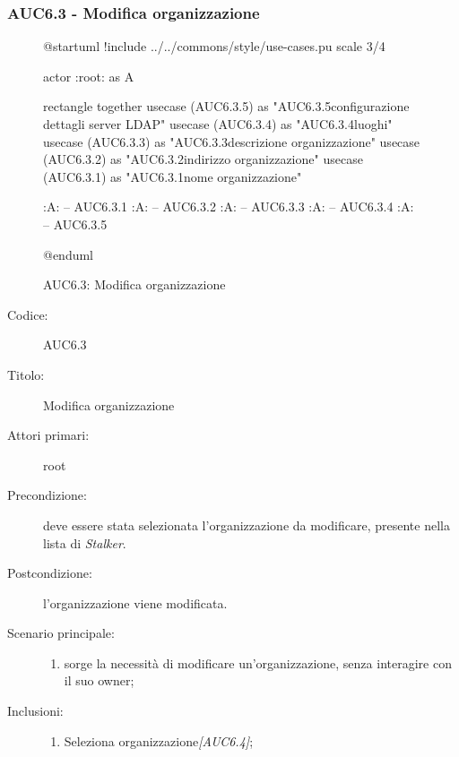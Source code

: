 \documentclass[casi-duso]{subfiles}
\begin{document}
\subsubsection{AUC6.3 - Modifica organizzazione}%
\label{subsub:AUC6.3}

\begin{figure}[h!]
  \centering
  \begin{plantuml}
  @startuml
  !include ../../commons/style/use-cases.pu
  scale 3/4

  actor :root: as A

  rectangle {
    together {
      usecase (AUC6.3.5) as "AUC6.3.5\nModifica configurazione dettagli server LDAP"
      usecase (AUC6.3.4) as "AUC6.3.4\nGestione luoghi"
      usecase (AUC6.3.3) as "AUC6.3.3\nModifica descrizione organizzazione"
      usecase (AUC6.3.2) as "AUC6.3.2\nModifica indirizzo organizzazione"
      usecase (AUC6.3.1) as "AUC6.3.1\nModifica nome organizzazione"
    }
  }

  :A: -- AUC6.3.1
  :A: -- AUC6.3.2
  :A: -- AUC6.3.3
  :A: -- AUC6.3.4
  :A: -- AUC6.3.5

  @enduml
  \end{plantuml}
  \caption{AUC6.3: Modifica organizzazione}
  \label{fig:auc6_3}
\end{figure}

\begin{description}
  \item[Codice:] AUC6.3
  \item[Titolo:] Modifica organizzazione
  \item[Attori primari:] root
  \item[Precondizione:] deve essere stata selezionata l'organizzazione da modificare, presente nella lista di \emph{Stalker}.
  \item[Postcondizione:] l'organizzazione viene modificata.
  \item[Scenario principale:]
  \begin{enumerate}
    \item sorge la necessità di modificare un'organizzazione, senza interagire con il suo owner;
  \end{enumerate}
  \item[Inclusioni:]
  \begin{enumerate}
    \item Seleziona organizzazione\emph{[AUC6.4]};
  \end{enumerate}
\end{description}
\end{document}
